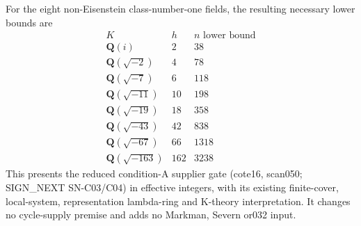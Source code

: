 For the eight non-Eisenstein class-number-one fields, the
resulting necessary lower bounds are
\[
\begin{array}{c|r|r}
K&h&n\text{ lower bound}\\\hline
\mathbf Q(i)&2&38\\
\mathbf Q(\sqrt{-2})&4&78\\
\mathbf Q(\sqrt{-7})&6&118\\
\mathbf Q(\sqrt{-11})&10&198\\
\mathbf Q(\sqrt{-19})&18&358\\
\mathbf Q(\sqrt{-43})&42&838\\
\mathbf Q(\sqrt{-67})&66&1318\\
\mathbf Q(\sqrt{-163})&162&3238
\end{array}                                               \tag{ALT10.8}
\]
This presents the reduced condition-A supplier gate
(cote16, scan050; SIGN\_NEXT SN-C03/C04) in effective integers,
with its existing finite-cover, local-system, representation
lambda-ring and K-theory interpretation. It changes no
cycle-supply premise and adds no Markman, Severn or032 input.
